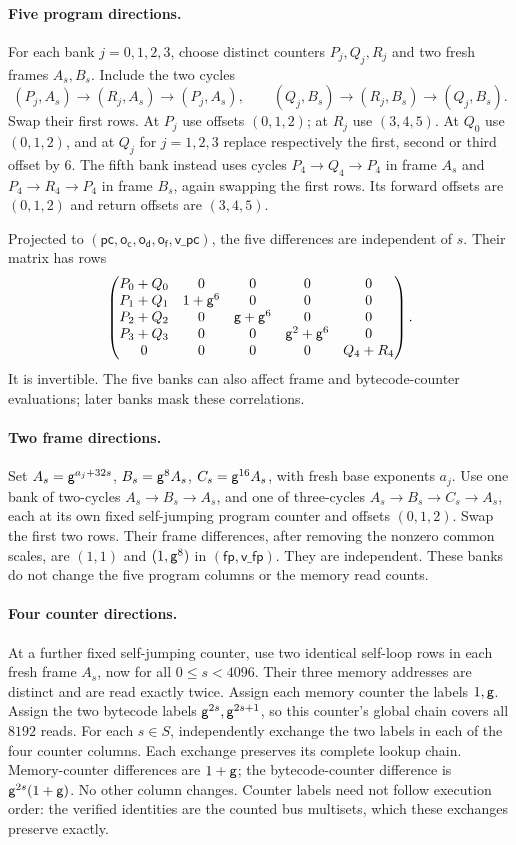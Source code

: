 \paragraph{Five program directions.} For each bank $j=0,1,2,3$, choose distinct counters $P_j,Q_j,R_j$ and two fresh frames $A_s,B_s$. Include the two cycles
\[
 (P_j,A_s)\to(R_j,A_s)\to(P_j,A_s),\qquad
 (Q_j,B_s)\to(R_j,B_s)\to(Q_j,B_s).
\]
Swap their first rows. At $P_j$ use offsets $(0,1,2)$; at $R_j$ use $(3,4,5)$. At $Q_0$ use $(0,1,2)$, and at $Q_j$ for $j=1,2,3$ replace respectively the first, second or third offset by $6$. The fifth bank instead uses cycles $P_4\to Q_4\to P_4$ in frame $A_s$ and $P_4\to R_4\to P_4$ in frame $B_s$, again swapping the first rows. Its forward offsets are $(0,1,2)$ and return offsets are $(3,4,5)$.

Projected to $(\mathsf{pc},\mathsf{o_c},\mathsf{o_d},\mathsf{o_f},\mathsf{v\_pc})$, the five differences are independent of $s$. Their matrix has rows
\[
 \begin{pmatrix}
 P_0+Q_0&0&0&0&0\\
 P_1+Q_1&1+\mathsf{g}^6&0&0&0\\
 P_2+Q_2&0&\mathsf{g}+\mathsf{g}^6&0&0\\
 P_3+Q_3&0&0&\mathsf{g}^2+\mathsf{g}^6&0\\
 0&0&0&0&Q_4+R_4
 \end{pmatrix}.
\]
It is invertible. The five banks can also affect frame and bytecode-counter evaluations; later banks mask these correlations.

\paragraph{Two frame directions.} Set $A_s=\mathsf{g}^{a_j+32s}$, $B_s=\mathsf{g}^8 A_s$, $C_s=\mathsf{g}^{16}A_s$, with fresh base exponents $a_j$. Use one bank of two-cycles $A_s\to B_s\to A_s$, and one of three-cycles $A_s\to B_s\to C_s\to A_s$, each at its own fixed self-jumping program counter and offsets $(0,1,2)$. Swap the first two rows. Their frame differences, after removing the nonzero common scales, are $(1,1)$ and $(1,\mathsf{g}^8)$ in $(\mathsf{fp},\mathsf{v\_fp})$. They are independent. These banks do not change the five program columns or the memory read counts.

\paragraph{Four counter directions.} At a further fixed self-jumping counter, use two identical self-loop rows in each fresh frame $A_s$, now for all $0\le s<4096$. Their three memory addresses are distinct and are read exactly twice. Assign each memory counter the labels $1,\mathsf{g}$. Assign the two bytecode labels $\mathsf{g}^{2s},\mathsf{g}^{2s+1}$, so this counter's global chain covers all $8192$ reads. For each $s\in S$, independently exchange the two labels in each of the four counter columns. Each exchange preserves its complete lookup chain. Memory-counter differences are $1+\mathsf{g}$; the bytecode-counter difference is $\mathsf{g}^{2s}(1+\mathsf{g})$. No other column changes. Counter labels need not follow execution order: the verified identities are the counted bus multisets, which these exchanges preserve exactly.

